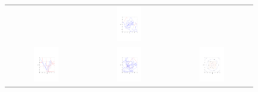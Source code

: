 \documentclass{article} %
\begin{document}
\begin{figure}[t!]
\begin{center}
\begin{tabular}{ccc}
&\includegraphics[trim={3.2cm 6cm 3cm 9cm},clip,width=0.33\textwidth]{../plots3/ReflectiveHMC_l25_eps0_1_log_scatter2D.pdf} \\
  \includegraphics[trim={3.2cm 6cm 3.2cm 9cm},clip,width=0.33\textwidth]{../plots3/BaselineHMC_l25_eps0_2_log_scatter2D.pdf} 
&\includegraphics[trim={3.2cm 6cm 3.2cm 9cm},clip,width=0.33\textwidth]{../plots3/ReflectiveHMC_l25_eps0_2_log_scatter2D.pdf} 
&\includegraphics[trim={3.2cm 6cm 3.2cm 9cm},clip,width=0.33\textwidth]{../plots3/dist_contour.pdf} 

\end{tabular}
\end{center}
\end{figure}
\end{document}
